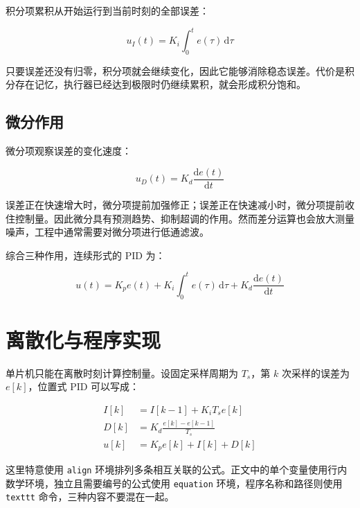 积分项累积从开始运行到当前时刻的全部误差：

\begin{equation}
u_{I}(t)=K_{i}\int_{0}^{t}e(\tau)\,\mathrm{d}\tau
\end{equation}

只要误差还没有归零，积分项就会继续变化，因此它能够消除稳态误差。代价是积分存在记忆，执行器已经达到极限时仍继续累积，就会形成积分饱和。

\subsection{微分作用}

微分项观察误差的变化速度：

\begin{equation}
u_{D}(t)=K_{d}\frac{\mathrm{d}e(t)}{\mathrm{d}t}
\end{equation}

误差正在快速增大时，微分项提前加强修正；误差正在快速减小时，微分项提前收住控制量。因此微分具有预测趋势、抑制超调的作用。然而差分运算也会放大测量噪声，工程中通常需要对微分项进行低通滤波。

综合三种作用，连续形式的 PID 为：

\begin{equation}
u(t)=K_{p}e(t)+K_{i}\int_{0}^{t}e(\tau)\,\mathrm{d}\tau+K_{d}\frac{\mathrm{d}e(t)}{\mathrm{d}t}
\label{eq:continuous-pid}
\end{equation}

\section{离散化与程序实现}

单片机只能在离散时刻计算控制量。设固定采样周期为 $T_s$，第 $k$ 次采样的误差为 $e[k]$，位置式 PID 可以写成：

\begin{align}
I[k] &= I[k-1]+K_iT_se[k] \label{eq:pid-integral}\\
D[k] &= K_d\frac{e[k]-e[k-1]}{T_s} \label{eq:pid-derivative}\\
u[k] &= K_pe[k]+I[k]+D[k] \label{eq:pid-position}
\end{align}

这里特意使用 \texttt{align} 环境排列多条相互关联的公式。正文中的单个变量使用行内数学环境，独立且需要编号的公式使用 \texttt{equation} 环境，程序名称和路径则使用 \texttt{texttt} 命令，三种内容不要混在一起。

